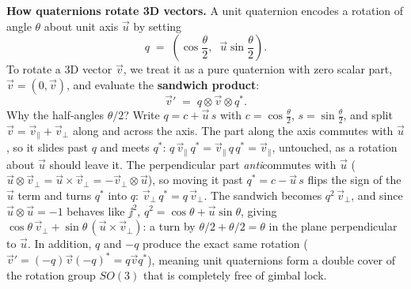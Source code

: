 \begin{intuitionbox}
\textbf{How quaternions rotate 3D vectors.}
A unit quaternion encodes a rotation of angle $\theta$ about unit axis $\vec{u}$ by setting
\[
  q \;=\; \left(\cos\frac{\theta}{2},\;\; \vec{u}\sin\frac{\theta}{2}\right).
\]
To rotate a 3D vector $\vec{v}$, we treat it as a pure quaternion with zero scalar part,
$\vec{v} = (0, \vec{v})$, and evaluate the \textbf{sandwich product}:
\[
  \vec{v}' \;=\; q \otimes \vec{v} \otimes q^*.
\]
Why the half-angles $\theta/2$? Write $q = c + \vec{u}\,s$ with $c=\cos\frac{\theta}{2}$,
$s=\sin\frac{\theta}{2}$, and split $\vec{v} = \vec{v}_\parallel + \vec{v}_\perp$ along and
across the axis. The part along the axis commutes with $\vec{u}$, so it slides past $q$ and
meets $q^*$: $q\,\vec{v}_\parallel\,q^* = \vec{v}_\parallel\,q\,q^* = \vec{v}_\parallel$,
untouched, as a rotation about $\vec{u}$ should leave it. The perpendicular part
\emph{anti}commutes with $\vec{u}$ ($\vec{u}\otimes\vec{v}_\perp = \vec{u}\times\vec{v}_\perp
= -\vec{v}_\perp\otimes\vec{u}$), so moving it past $q^* = c - \vec{u}\,s$ flips the sign of
the $\vec{u}$ term and turns $q^*$ into $q$: $\vec{v}_\perp\,q^* = q\,\vec{v}_\perp$. The
sandwich becomes $q^2\,\vec{v}_\perp$, and since $\vec{u}\otimes\vec{u} = -1$ behaves like
$\jj^2$, $q^2 = \cos\theta + \vec{u}\sin\theta$, giving
$\cos\theta\,\vec{v}_\perp + \sin\theta\,(\vec{u}\times\vec{v}_\perp)$: a turn by
$\theta/2 + \theta/2 = \theta$ in the plane perpendicular to $\vec{u}$.
In addition, $q$ and $-q$ produce the exact same rotation ($\vec{v}' = (-q)\vec{v}(-q)^* = q\vec{v}q^*$),
meaning unit quaternions form a double cover of the rotation group $SO(3)$ that is completely free of
gimbal lock.
\end{intuitionbox}

